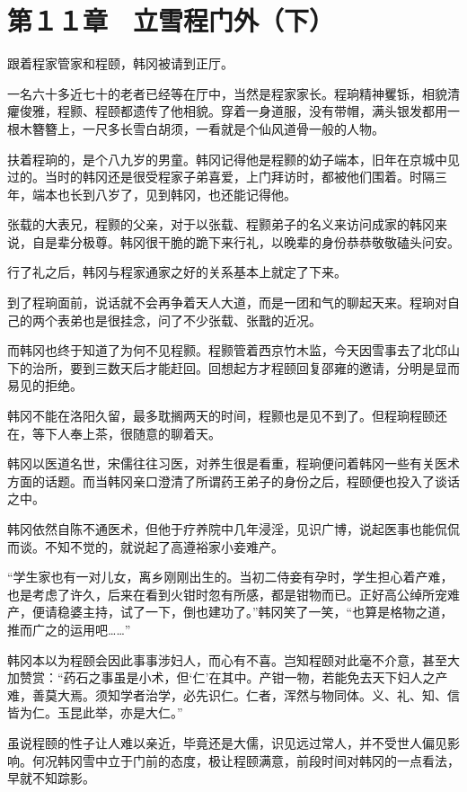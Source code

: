 \section{第１１章　立雪程门外（下）}

跟着程家管家和程颐，韩冈被请到正厅。

一名六十多近七十的老者已经等在厅中，当然是程家家长。程珦精神矍铄，相貌清癯俊雅，程颢、程颐都遗传了他相貌。穿着一身道服，没有带帽，满头银发都用一根木簪簪上，一尺多长雪白胡须，一看就是个仙风道骨一般的人物。

扶着程珦的，是个八九岁的男童。韩冈记得他是程颢的幼子端本，旧年在京城中见过的。当时的韩冈还是很受程家子弟喜爱，上门拜访时，都被他们围着。时隔三年，端本也长到八岁了，见到韩冈，也还能记得他。

张载的大表兄，程颢的父亲，对于以张载、程颢弟子的名义来访问成家的韩冈来说，自是辈分极尊。韩冈很干脆的跪下来行礼，以晚辈的身份恭恭敬敬磕头问安。

行了礼之后，韩冈与程家通家之好的关系基本上就定了下来。

到了程珦面前，说话就不会再争着天人大道，而是一团和气的聊起天来。程珦对自己的两个表弟也是很挂念，问了不少张载、张戬的近况。

而韩冈也终于知道了为何不见程颢。程颢管着西京竹木监，今天因雪事去了北邙山下的治所，要到三数天后才能赶回。回想起方才程颐回复邵雍的邀请，分明是显而易见的拒绝。

韩冈不能在洛阳久留，最多耽搁两天的时间，程颢也是见不到了。但程珦程颐还在，等下人奉上茶，很随意的聊着天。

韩冈以医道名世，宋儒往往习医，对养生很是看重，程珦便问着韩冈一些有关医术方面的话题。而当韩冈亲口澄清了所谓药王弟子的身份之后，程颐便也投入了谈话之中。

韩冈依然自陈不通医术，但他于疗养院中几年浸淫，见识广博，说起医事也能侃侃而谈。不知不觉的，就说起了高遵裕家小妾难产。

“学生家也有一对儿女，离乡刚刚出生的。当初二侍妾有孕时，学生担心着产难，也是考虑了许久，后来在看到火钳时忽有所感，都是钳物而已。正好高公绰所宠难产，便请稳婆主持，试了一下，倒也建功了。”韩冈笑了一笑，“也算是格物之道，推而广之的运用吧……”

韩冈本以为程颐会因此事事涉妇人，而心有不喜。岂知程颐对此毫不介意，甚至大加赞赏：“药石之事虽是小术，但‘仁’在其中。产钳一物，若能免去天下妇人之产难，善莫大焉。须知学者治学，必先识仁。仁者，浑然与物同体。义、礼、知、信皆为仁。玉昆此举，亦是大仁。”

虽说程颐的性子让人难以亲近，毕竟还是大儒，识见远过常人，并不受世人偏见影响。何况韩冈雪中立于门前的态度，极让程颐满意，前段时间对韩冈的一点看法，早就不知踪影。

